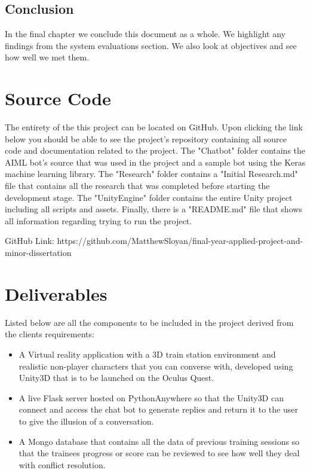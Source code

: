 \subsection{Conclusion}
In the final chapter we conclude this document as a whole. We highlight any findings from the system evaluations section. We also look at objectives and see how well we met them.

\section{Source Code}
The entirety of the this project can be located on GitHub. Upon clicking the link below you should be able to see the project's repository containing all source code and documentation related to the project. The "Chatbot" folder contains the AIML bot's source that was used in the project and a sample bot using the Keras machine learning library. The "Research" folder contains a "Initial Research.md" file that contains all the research that was completed before starting the development stage. The "UnityEngine" folder contains the entire Unity project including all scripts and assets. Finally, there is a "README.md" file that shows all information regarding trying to run the project.
\newline

GitHub Link: https://github.com/MatthewSloyan/final-year-applied-project-and-minor-dissertation

\section{Deliverables}
Listed below are all the components to be included in the project derived from the clients requirements:

\begin{itemize}
    \item A Virtual reality application with a 3D train station environment and realistic non-player characters that you can converse with, developed using Unity3D that is to be launched on the Oculus Quest.
    
    \item A live Flask server hosted on PythonAnywhere so that the Unity3D can connect and access the chat bot to generate replies and return it to the user to give the illusion of a conversation.
    
    \item A Mongo database that contains all the data of previous training sessions so that the trainees progress or score can be reviewed to see how well they deal with conflict resolution. 
\end{itemize}
